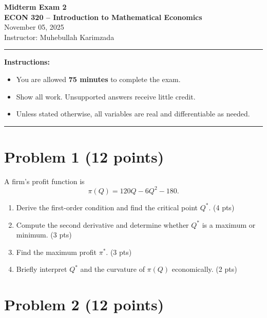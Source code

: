 \documentclass[12pt]{article}
\begin{document}
\begin{center}
{\Large \textbf{Midterm Exam 2}} \\[0.9em]
\textbf{ECON 320 -- Introduction to Mathematical Economics} \\[0.7em]

November 05, 2025
 \\[0.8em]
Instructor: Muhebullah Karimzada
\end{center}

\hrule

\textbf{Instructions:}
\begin{itemize}
\item You are allowed \textbf{75 minutes} to complete the exam.
    \item Show all work. Unsupported answers receive little credit.

    \item Unless stated otherwise, all variables are real and differentiable as needed.
\end{itemize}

\hrule

\section*{Problem 1 (12 points)}

A firm’s profit function is
\[
\pi(Q) = 120Q - 6Q^2 - 180.
\]

\begin{enumerate}[label=(\alph*),leftmargin=1.5em]
    \item Derive the first-order condition and find the critical point \(Q^*\). \hfill (4 pts)
    \item Compute the second derivative and determine whether \(Q^*\) is a maximum or minimum. \hfill (3 pts)
    \item Find the maximum profit \(\pi^*\). \hfill (3 pts)
    \item Briefly interpret \(Q^*\) and the curvature of \(\pi(Q)\) economically. \hfill (2 pts)
\end{enumerate}



\section*{Problem 2  (12 points)}
\end{document}
